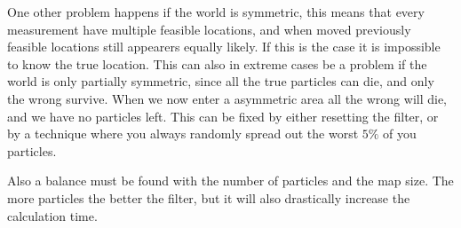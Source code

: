 One other problem happens if the world is symmetric, this means that every measurement have multiple feasible locations, and when moved previously feasible locations still appearers equally likely. If this is the case it is impossible to know the true location. This can also in extreme cases be a problem if the world is only partially symmetric, since all the true particles can die, and only the wrong survive. When we now enter a asymmetric area all the wrong will die, and we have no particles left. This can be fixed by either resetting the filter, or by a technique where you always randomly spread out the worst $5\%$ of you particles. 

Also a balance must be found with the number of particles and the map size. The more particles the better the filter, but it will also drastically increase the calculation time. 

